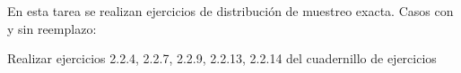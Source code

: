 \documentclass{oxmathproblems}
\begin{document}
En esta tarea se realizan ejercicios de distribución de muestreo exacta. Casos con y sin reemplazo:


Realizar ejercicios 2.2.4, 2.2.7, 2.2.9, 2.2.13, 2.2.14 del cuadernillo de ejercicios
\end{document}
